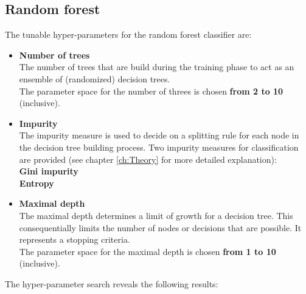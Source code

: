 {{{\subsection*{Random forest}

The tunable hyper-parameters for the random forest classifier are:
\begin{itemize}

\item{\textbf{Number of trees}}\\
The number of trees that are build during the training phase to act as an ensemble of (randomized) decision trees.\\
The parameter space for the number of threes is chosen \textbf{from 2 to 10} (inclusive). 

\item{\textbf{Impurity}}\\
The impurity measure is used to decide on a splitting rule for each node in the decision tree building process.
Two impurity measures for classification are provided (see chapter \ref{ch:Theory} for more detailed explanation):\\
\textbf{Gini impurity}  \\
\textbf{Entropy}
\item{\textbf{Maximal depth}}\\
The maximal depth determines a limit of growth for a decision tree. This consequentially limits the number of nodes or decisions that are possible. It represents a stopping criteria. \\
The parameter space for the maximal depth is chosen \textbf{from 1 to 10} (inclusive). 
\end{itemize}

The hyper-parameter search reveals the following results: \\


}}}
